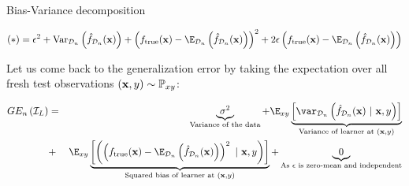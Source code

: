 \documentclass[11pt,compress,t,notes=noshow, xcolor=table]{beamer}
\begin{document}
\begin{vbframe} {Bias-Variance decomposition}
\begin{footnotesize}
$$
(*) = \epsilon^2 + \text{Var}_{\D_n}\left(\fh_{\D_n}(\xv)\right) + 
  \left(\ftrue(\xv) - \E_{\D_n}\left(\fh_{\D_n}(\xv)\right)\right)^2
 +2 \epsilon \left(\ftrue(\xv) - \E_{\D_n}\left(\fh_{\D_n}(\xv)\right)\right)
$$
\end{footnotesize}
\vspace{0.2cm}
Let us come back to the generalization error by taking the expectation over all fresh test observations $(\mathbf{x}, y) \sim \mathbb{P}_{xy}$: 
\vspace{0.8cm}
\begin{footnotesize}
\begin{eqnarray*}
GE_n\left(\ind_{L}\right) 
  &=& \underbrace{\sigma^2}_{\text{Variance of the data}} + \E_{xy}\underbrace{\left[\var_{\D_n}\left(\fh_{\D_n}(\xv) ~|~\xv, y\right)\right]}_{\text{Variance of learner at } (\xv, y)} \\ &+& \E_{xy}\underbrace{\left[\left(\left(\ftrue(\xv)-\E_{\D_n}\left(\fh_{\D_n}(\xv)\right)\right)^2~|~\xv, y\right)\right]}_{\text{Squared bias of learner at } (\xv, y)} + \underbrace{0}_{\text{As $\epsilon$ is zero-mean and independent}}
\end{eqnarray*}
\end{footnotesize}



\end{vbframe}



\endlecture
\end{document}
